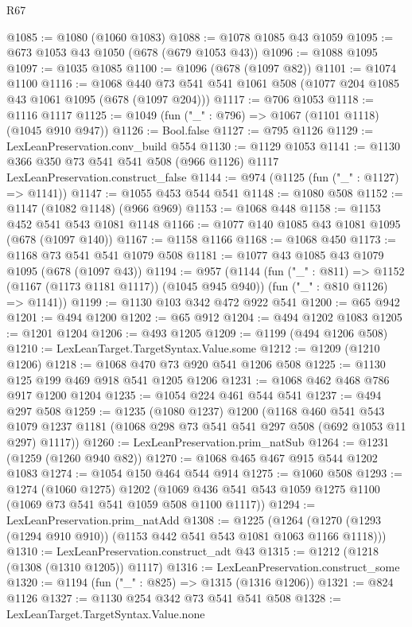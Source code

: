\begin{lexlean}{R67}
\begin{coremodule}
@1085 := @1080 (@1060 @1083)
@1088 := @1078 @1085 @43 @1059
@1095 := @673 @1053 @43 @1050 (@678 (@679 @1053 @43))
@1096 := @1088 @1095
@1097 := @1035 @1085
@1100 := @1096 (@678 (@1097 @82))
@1101 := @1074 @1100
@1116 := @1068 @440 @73 @541 @541 @1061 @508 (@1077 @204 @1085 @43 @1061 @1095 (@678 (@1097 @204)))
@1117 := @706 @1053
@1118 := @1116 @1117
@1125 := @1049 (fun ("_" : @796) => @1067 (@1101 @1118) (@1045 @910 @947))
@1126 := Bool.false
@1127 := @795 @1126
@1129 := LexLeanPreservation.conv_build @554
@1130 := @1129 @1053
@1141 := @1130 @366 @350 @73 @541 @541 @508 (@966 @1126) @1117 LexLeanPreservation.construct_false
@1144 := @974 (@1125 (fun ("_" : @1127) => @1141))
@1147 := @1055 @453 @544 @541
@1148 := @1080 @508
@1152 := @1147 (@1082 @1148) (@966 @969)
@1153 := @1068 @448
@1158 := @1153 @452 @541 @543 @1081 @1148
@1166 := @1077 @140 @1085 @43 @1081 @1095 (@678 (@1097 @140))
@1167 := @1158 @1166
@1168 := @1068 @450
@1173 := @1168 @73 @541 @541 @1079 @508
@1181 := @1077 @43 @1085 @43 @1079 @1095 (@678 (@1097 @43))
@1194 := @957
    (@1144
      (fun ("_" : @811) => @1152 (@1167 (@1173 @1181 @1117)) (@1045 @945 @940))
      (fun ("_" : @810 @1126) => @1141))
@1199 := @1130 @103 @342 @472 @922 @541
@1200 := @65 @942
@1201 := @494 @1200
@1202 := @65 @912
@1204 := @494 @1202 @1083
@1205 := @1201 @1204
@1206 := @493 @1205
@1209 := @1199 (@494 @1206 @508)
@1210 := LexLeanTarget.TargetSyntax.Value.some
@1212 := @1209 (@1210 @1206)
@1218 := @1068 @470 @73 @920 @541 @1206 @508
@1225 := @1130 @125 @199 @469 @918 @541 @1205 @1206
@1231 := @1068 @462 @468 @786 @917 @1200 @1204
@1235 := @1054 @224 @461 @544 @541
@1237 := @494 @297 @508
@1259 := @1235
    (@1080 @1237)
    @1200
    (@1168
      @460
      @541
      @543
      @1079
      @1237
      @1181
      (@1068 @298 @73 @541 @541 @297 @508 (@692 @1053 @11 @297) @1117))
@1260 := LexLeanPreservation.prim_natSub
@1264 := @1231 (@1259 (@1260 @940 @82))
@1270 := @1068 @465 @467 @915 @544 @1202 @1083
@1274 := @1054 @150 @464 @544 @914
@1275 := @1060 @508
@1293 := @1274
    (@1060 @1275)
    @1202
    (@1069 @436 @541 @543 @1059 @1275 @1100 (@1069 @73 @541 @541 @1059 @508 @1100 @1117))
@1294 := LexLeanPreservation.prim_natAdd
@1308 := @1225
    (@1264 (@1270 (@1293 (@1294 @910 @910)) (@1153 @442 @541 @543 @1081 @1063 @1166 @1118)))
@1310 := LexLeanPreservation.construct_adt @43
@1315 := @1212 (@1218 (@1308 (@1310 @1205)) @1117)
@1316 := LexLeanPreservation.construct_some
@1320 := @1194 (fun ("_" : @825) => @1315 (@1316 @1206))
@1321 := @824 @1126
@1327 := @1130 @254 @342 @73 @541 @541 @508
@1328 := LexLeanTarget.TargetSyntax.Value.none

\end{coremodule}
\end{lexlean}
